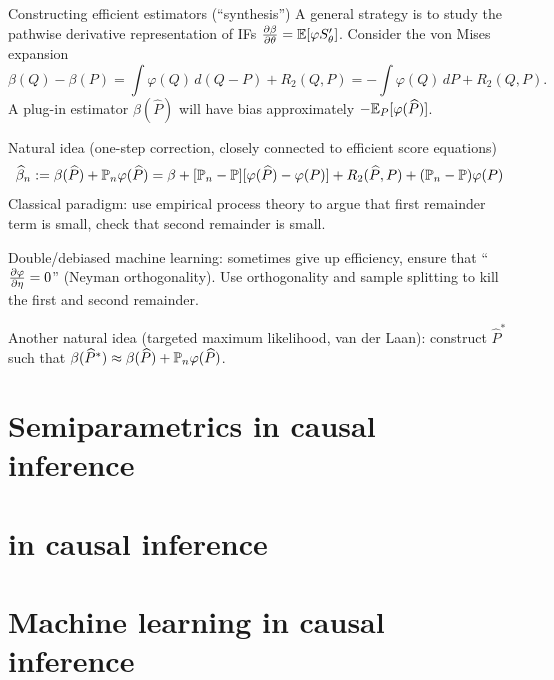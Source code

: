 \documentclass[10pt,aspectratio=169,handout]{beamer}
\theoremstyle{definition}
\begin{document}
\begin{frame}{Constructing efficient estimators (``synthesis'')}
\small
  A general strategy is to study the \alert{pathwise derivative}
  representation of
  IFs $\diff{\beta}{\theta} = \E[\varphi S_\theta']$. Consider the 
  \alert{von Mises expansion} \[
  \beta(Q) - \beta(P) = \int \varphi(Q) \,d(Q-P) + R_2(Q,P) = -\int \varphi
  (Q)\,dP + R_2(Q,P). 
  \]
  A plug-in estimator $\beta(\hat P)$ will have bias approximately $-\E_P
  [\varphi(\hat P)]$. 
  
  Natural idea (\alert{one-step correction}, closely
  connected to efficient score equations)
  \[
  \hat \beta_n := \beta(\hat P) + \P_n \varphi(\hat P) = \beta + [\P_n -
  \P][\varphi(\hat P) - \varphi(P)] + R_2(\hat P, P) + (\P_n - \P)\varphi
  (P)
  \]
  Classical paradigm: use empirical process theory to argue that first
  remainder term is small, check that second remainder is small.
  
  \alert{Double/debiased machine learning}: sometimes give up efficiency,
  ensure that ``$\diff{\varphi}{\eta} = 0$'' (Neyman orthogonality). Use
  orthogonality and sample splitting to kill the first and second
  remainder. 
  
  Another natural idea (\alert{targeted maximum likelihood}, van der Laan):
  construct $\hat P^*$ such that $\beta(\hat P^*) \approx \beta(\hat P) +
  \P_n \varphi(\hat P)$.
  
  

  \end{frame}
\hypertarget{sec:applied}{} 
\section{Semiparametrics in causal inference}

\section{{} in causal inference}

\section{\alert{Machine learning} in causal inference}
\end{document}
